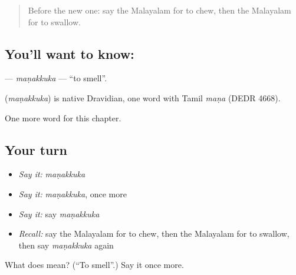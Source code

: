 \begin{quote}
Before the new one: say the Malayalam for to chew, then the Malayalam for to swallow.
\end{quote}

\subsection*{You'll want to know: }
\textbf{} — \emph{maṇakkuka} — \textquotedblleft{}to smell\textquotedblright{}.

\begin{cousinweb}
\textbf{} (\emph{maṇakkuka}) is native Dravidian, one word with Tamil \emph{maṇa} (DEDR 4668).
\end{cousinweb}

\begin{grammarlens}[title={What you've built}]
One more word for this chapter.
\end{grammarlens}

\subsection*{Your turn}
\begin{itemize}
\raggedright
  \item \emph{Say it:} \emph{maṇakkuka}
  \item \emph{Say it:} \emph{maṇakkuka}, once more
  \item \emph{Say it:} say \emph{maṇakkuka}
  \item \emph{Recall:} say the Malayalam for to chew, then the Malayalam for to swallow, then say \emph{maṇakkuka} again
\end{itemize}

\begin{tcolorbox}[breakable,colback=teal!4,colframe=teal!35!black,title={Before you move on}]
What does  mean? (\textquotedblleft{}To smell\textquotedblright{}.) Say it once more.
\end{tcolorbox}
